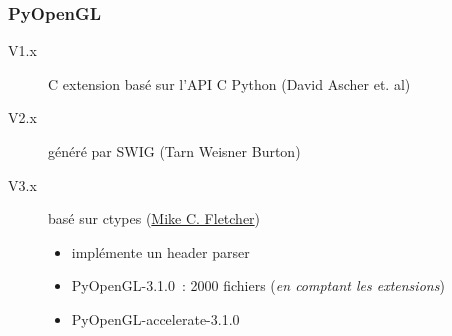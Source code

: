 \begin{frame}
  \frametitle{PyOpenGL}
    \begin{description}
    \item[V1.x] C extension basé sur l'API C Python {\tiny (David Ascher et. al)}
    \item[V2.x] généré par SWIG {\tiny (Tarn Weisner Burton)}
    \item[V3.x] basé sur ctypes {\tiny (\href{http://www.vrplumber.com}{Mike C. Fletcher})}
      \begin{itemize}
      \item implémente un header parser
      \item PyOpenGL-3.1.0~: 2000 fichiers \small({\emph{en comptant les extensions})}
      \item PyOpenGL-accelerate-3.1.0
      \end{itemize}
    \end{description}
\end{frame}

